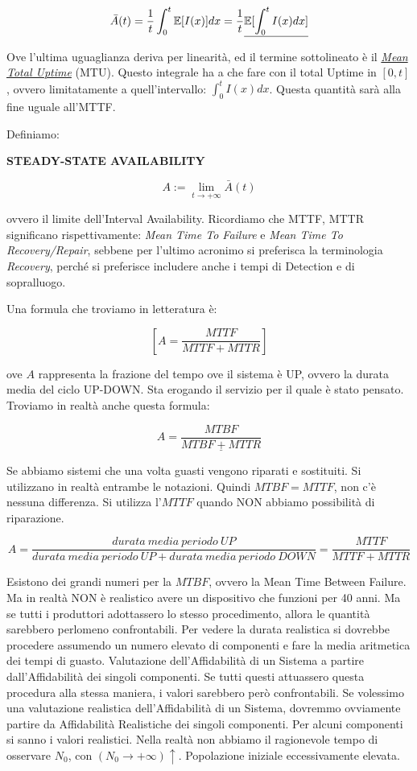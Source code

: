 \[
	\bar{A}(t) = \frac{1}{t}\int_0^t{\operatorname{\mathbb{E}}[I(x)]dx} = \frac{1}{t}\underline{\operatorname{\mathbb{E}}[\int_0^t{I(x)dx}]}
\]

Ove l'ultima uguaglianza deriva per linearità, ed il termine sottolineato è il \newline \underline{\textit{Mean Total Uptime}} (MTU). Questo integrale ha a che fare con il total Uptime in $[0,t]$, ovvero limitatamente a quell'intervallo: $\int_0^t{I(x)dx}$. Questa quantità sarà alla fine uguale all'MTTF.

Definiamo:

\begin{defn}{\textbf{STEADY-STATE AVAILABILITY}}

\[
	A := \lim_{t\to +\infty}{\bar{A}(t)}
\]
\end{defn}

ovvero il limite dell'Interval Availability. Ricordiamo che MTTF, MTTR significano rispettivamente: \textit{Mean Time To Failure} e \textit{Mean Time To Recovery/Repair}, sebbene per l'ultimo acronimo si preferisca la terminologia \textit{Recovery}, perché si preferisce includere anche i tempi di Detection e di sopralluogo. 

Una formula che troviamo in letteratura è:

\[
	[A = \frac{MTTF}{MTTF+MTTR}]
\]

ove $A$ rappresenta la frazione del tempo ove il sistema è UP, ovvero la durata media del ciclo UP-DOWN. Sta erogando il servizio per il quale è stato pensato. Troviamo in realtà anche questa formula:

\[
	A = \underline{\frac{MTBF}{MTBF+MTTR}}
\]

Se abbiamo sistemi che una volta guasti vengono riparati e sostituiti. Si utilizzano in realtà entrambe le notazioni. Quindi $MTBF=MTTF$, non c'è nessuna differenza. Si utilizza l'$MTTF$ quando NON abbiamo possibilità di riparazione.

\[
	A = \frac{durata\ media\ periodo\ UP}{durata\ media\ periodo\ UP+durata\ media\ periodo\ DOWN} = \frac{MTTF}{MTTF+MTTR}
\]

Esistono dei grandi numeri per la $MTBF$, ovvero la Mean Time Between Failure. Ma in realtà NON è realistico avere un dispositivo che funzioni per 40 anni. Ma se tutti i produttori adottassero lo stesso procedimento, allora le quantità sarebbero perlomeno confrontabili. Per vedere la durata realistica si dovrebbe procedere assumendo un numero elevato di componenti e fare la media aritmetica dei tempi di guasto. Valutazione dell'Affidabilità di un Sistema a partire dall'Affidabilità dei singoli componenti. Se tutti questi attuassero questa procedura alla stessa maniera, i valori sarebbero però confrontabili. Se volessimo una valutazione realistica dell'Affidabilità di un Sistema, dovremmo ovviamente partire da Affidabilità Realistiche dei singoli componenti. Per alcuni componenti si sanno i valori realistici. Nella realtà non abbiamo il ragionevole tempo di osservare $N_0$, con $(N_0\to +\infty)\uparrow$. Popolazione iniziale eccessivamente elevata.

